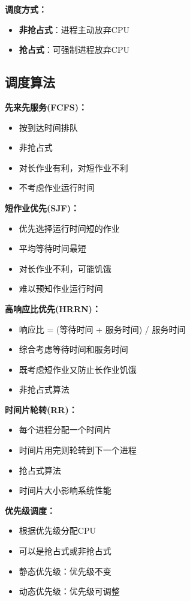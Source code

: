 \documentclass[lang=cn,newtx,10pt,scheme=chinese]{../../elegantbook}
\begin{document}
\textbf{调度方式：}
\begin{itemize}
  \item \textbf{非抢占式}：进程主动放弃CPU
  \item \textbf{抢占式}：可强制进程放弃CPU
\end{itemize}

\subsection{调度算法}

\textbf{先来先服务(FCFS)：}
\begin{itemize}
  \item 按到达时间排队
  \item 非抢占式
  \item 对长作业有利，对短作业不利
  \item 不考虑作业运行时间
\end{itemize}

\textbf{短作业优先(SJF)：}
\begin{itemize}
  \item 优先选择运行时间短的作业
  \item 平均等待时间最短
  \item 对长作业不利，可能饥饿
  \item 难以预知作业运行时间
\end{itemize}

\textbf{高响应比优先(HRRN)：}
\begin{itemize}
  \item 响应比 = (等待时间 + 服务时间) / 服务时间
  \item 综合考虑等待时间和服务时间
  \item 既考虑短作业又防止长作业饥饿
  \item 非抢占式算法
\end{itemize}

\textbf{时间片轮转(RR)：}
\begin{itemize}
  \item 每个进程分配一个时间片
  \item 时间片用完则轮转到下一个进程
  \item 抢占式算法
  \item 时间片大小影响系统性能
\end{itemize}

\textbf{优先级调度：}
\begin{itemize}
  \item 根据优先级分配CPU
  \item 可以是抢占式或非抢占式
  \item 静态优先级：优先级不变
  \item 动态优先级：优先级可调整
\end{itemize}
\end{document}
